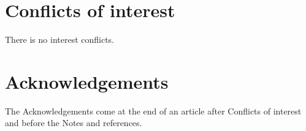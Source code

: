 \documentclass[twoside,twocolumn,9pt]{article}
\renewcommand{\refname}{Notes and references}
\begin{document}
\section*{Conflicts of interest}
There is no interest conflicts.

\section*{Acknowledgements}
The Acknowledgements come at the end of an article after Conflicts of interest and before the Notes and references.



\balance

\renewcommand\refname{Notes and references}

\end{document}
